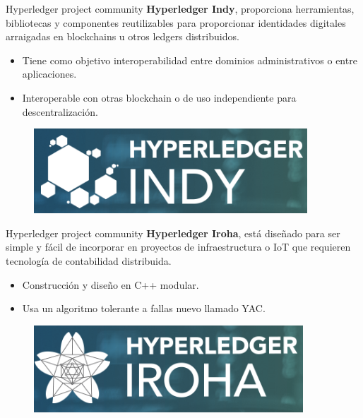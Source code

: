 \documentclass{beamer}
\begin{document}
	\begin{frame}
		\begin{block}{Hyperledger project community}
			\textbf{Hyperledger Indy}, proporciona herramientas, bibliotecas y componentes reutilizables para proporcionar identidades digitales arraigadas en blockchains u otros ledgers distribuidos.
			\begin{itemize}
				\item Tiene como objetivo interoperabilidad entre dominios administrativos o entre aplicaciones.
				\item Interoperable con otras blockchain o de uso independiente para descentralización.
			\end{itemize}
			\begin{figure}[h]
				\includegraphics[scale=.3]{indy_logo}
				\centering
			\end{figure}
		\end{block}
	\end{frame}

	\begin{frame}
		\begin{block}{Hyperledger project community}
			\textbf{Hyperledger Iroha}, está diseñado para ser simple y fácil de incorporar en proyectos de infraestructura o IoT que requieren tecnología de contabilidad distribuida.
			\begin{itemize}
				\item Construcción y diseño en C++ modular. 
				\item Usa un algoritmo tolerante a fallas nuevo llamado YAC.
			\end{itemize}
			\begin{figure}[h]
				\includegraphics[scale=.3]{iroha_logo}
				\centering
			\end{figure}
		\end{block}
	\end{frame}
\end{document}
